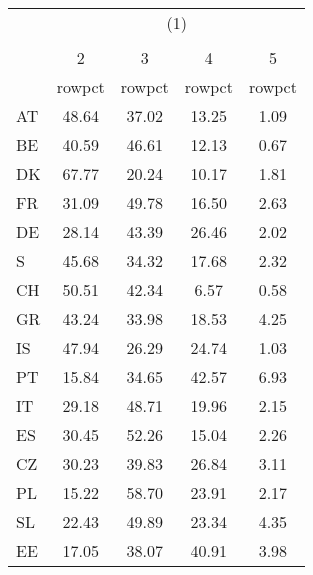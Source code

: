 {
\def\sym#1{\ifmmode^{#1}\else\(^{#1}\)\fi}
\begin{tabular}{l*{4}{c}}
\hline\hline
            &\multicolumn{4}{c}{(1)}                            \\
            &\multicolumn{4}{c}{}                               \\
            &           2&           3&           4&           5\\
            &      rowpct&      rowpct&      rowpct&      rowpct\\
\hline
AT          &       48.64&       37.02&       13.25&        1.09\\
BE          &       40.59&       46.61&       12.13&        0.67\\
DK          &       67.77&       20.24&       10.17&        1.81\\
FR          &       31.09&       49.78&       16.50&        2.63\\
DE          &       28.14&       43.39&       26.46&        2.02\\
S           &       45.68&       34.32&       17.68&        2.32\\
CH          &       50.51&       42.34&        6.57&        0.58\\
GR          &       43.24&       33.98&       18.53&        4.25\\
IS          &       47.94&       26.29&       24.74&        1.03\\
PT          &       15.84&       34.65&       42.57&        6.93\\
IT          &       29.18&       48.71&       19.96&        2.15\\
ES          &       30.45&       52.26&       15.04&        2.26\\
CZ          &       30.23&       39.83&       26.84&        3.11\\
PL          &       15.22&       58.70&       23.91&        2.17\\
SL          &       22.43&       49.89&       23.34&        4.35\\
EE          &       17.05&       38.07&       40.91&        3.98\\
\hline\hline
\end{tabular}
}
